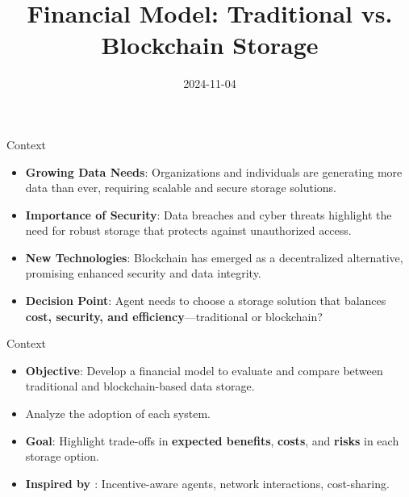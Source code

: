 \documentclass[aspectratio=169]{beamer}
\title{Financial Model: Traditional vs. Blockchain Storage}
\date{2024-11-04}
\begin{document}
	
	\begin{frame}
		\titlepage
	\end{frame}


 \begin{frame}{Context}
    \begin{itemize}
        \item \textbf{Growing Data Needs}: Organizations and individuals are generating more data than ever, requiring scalable and secure storage solutions.
        \item \textbf{Importance of Security}: Data breaches and cyber threats highlight the need for robust storage that protects against unauthorized access.
        \item \textbf{New Technologies}: Blockchain has emerged as a decentralized alternative, promising enhanced security and data integrity.
        \item \textbf{Decision Point}: Agent needs to choose a storage solution that balances \textbf{cost, security, and efficiency}—traditional or blockchain?
    \end{itemize}
\end{frame}



 \begin{frame}{Context}
    \begin{itemize}
        \item \textbf{Objective}: Develop a financial model to evaluate and compare between traditional and blockchain-based data storage.
        
        \item Analyze the adoption of each system.
        
        \item \textbf{Goal}: Highlight trade-offs in \textbf{expected benefits}, \textbf{costs}, and \textbf{risks} in each storage option.

        \item \textbf{Inspired by \cite{jalan_incentive-aware_2024} }: Incentive-aware agents, network interactions, cost-sharing.
        
    \end{itemize}
\end{frame}
\end{document}
